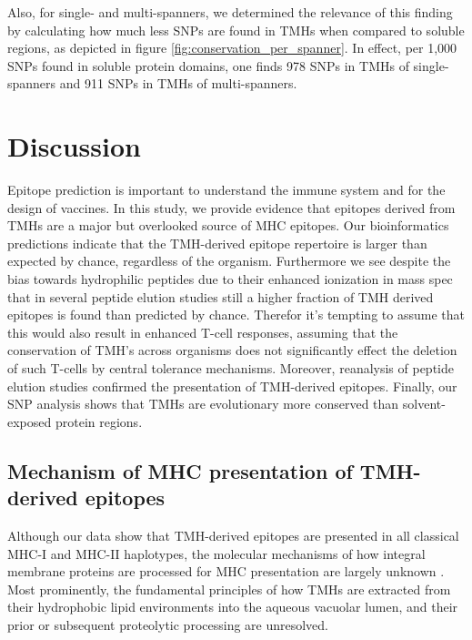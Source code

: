 Also, for single- and multi-spanners, 
we determined the relevance of this finding by
calculating how much less SNPs are found in TMHs
when compared to soluble regions,
as depicted in figure \ref{fig:conservation_per_spanner}.
In effect, per 1,000 SNPs found in soluble protein domains, 
one finds 978 SNPs in TMHs 
of single-spanners
and 911 SNPs in TMHs of multi-spanners.

\section{Discussion}


Epitope prediction is important to understand the immune system 
and for the design of vaccines.
In this study, we provide evidence that epitopes
derived from TMHs are a major but overlooked source of MHC epitopes. 
Our bioinformatics predictions indicate that the TMH-derived epitope repertoire is larger than expected by chance, 
regardless of the organism. Furthermore we see despite the bias towards hydrophilic peptides due to their enhanced ionization in mass spec that in several peptide elution studies still a higher fraction of TMH derived epitopes is found than predicted by chance. Therefor it's tempting to assume that this would also result in enhanced T-cell responses, assuming that the conservation of TMH's across organisms does not significantly effect the deletion of such T-cells by central tolerance mechanisms.
Moreover, reanalysis of peptide elution studies confirmed the presentation of TMH-derived epitopes.
Finally, our SNP analysis shows that TMHs are evolutionary more conserved 
than solvent-exposed protein regions.

\subsection{Mechanism of MHC presentation of TMH-derived epitopes}

Although our data show that 
TMH-derived epitopes are presented in all classical MHC-I and MHC-II haplotypes, 
the molecular mechanisms of how integral membrane proteins are processed 
for MHC presentation are largely unknown \cite{bianchi2017}. 
Most prominently, the fundamental principles of 
how TMHs are extracted from their hydrophobic lipid environments 
into the aqueous vacuolar lumen, 
and their prior or subsequent proteolytic processing are unresolved. 

